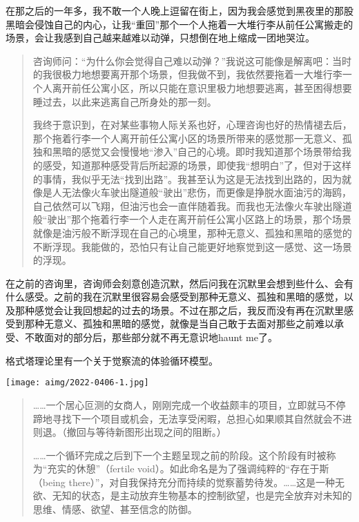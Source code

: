 在那之后的一年多，我不敢一个人晚上逗留在街上，因为我会感觉到黑夜里的那股黑暗会侵蚀自己的内心，让我“重回”那个一个人拖着一大堆行李从前任公寓搬走的场景，会让我感到自己越来越难以动弹，只想倒在地上缩成一团地哭泣。

\blockquote{
	咨询师问：“为什么你会觉得自己难以动弹？”我说这可能像是解离吧：当时的我很极力地想要离开那个场景，但我做不到，我依然要拖着一大堆行李一个人离开前任公寓小区，所以只能在意识里极力地想要逃离，甚至困得想要睡过去，以此来逃离自己所身处的那一刻。

	我终于意识到，在对某些事物\pozhehao{}人际关系也好，心理咨询也好\pozhehao{}的热情褪去后，那个拖着行李一个人离开前任公寓小区的场景所带来的感觉\pozhehao{}那一无意义、孤独和黑暗的感觉又会慢慢地“渗入”自己的心境。即时我知道那个场景带给我的感受，知道那种感受背后所起源的场景，即使我“想明白”了，但对于这样的事情，我似乎无法“找到出路”。我甚至认为这是无法找到出路的，因为就像是人无法像火车驶出隧道般“驶出”悲伤，而更像是挣脱水面油污的海鸥，自己依然可以飞翔，但油污也会一直伴随着我。而我也无法像火车驶出隧道般“驶出”那个拖着行李一个人走在离开前任公寓小区路上的场景，那个场景就像是油污般不断浮现在自己的心境里，那种无意义、孤独和黑暗的感觉的不断浮现。我能做的，恐怕只有让自己能更好地察觉到这一感觉、这一场景的浮现。

}

在之前的咨询里，咨询师会刻意创造沉默，然后问我在沉默里会想到些什么、会有什么感受。之前的我在沉默里很容易会感受到那种无意义、孤独和黑暗的感觉，以及那种感觉会让我回想起的过去的场景。不过在那之后，我反而没有再在沉默里感受到那种无意义、孤独和黑暗的感觉，就像是当自己敢于去面对那些之前难以承受、不敢面对的部分后，那些部分就不再无意识地haunt me了。

格式塔理论里有一个关于觉察流的体验循环模型。

\noindent\begin{minipage}{\linewidth}
	\centering
	\vspace{3pt}
	\texttt{[image: aimg/2022-0406-1.jpg]}
	\vspace{3pt}
\end{minipage}

\blockquote{
	……一个居心叵测的女商人，刚刚完成一个收益颇丰的项目，立即就马不停蹄地寻找下一个项目或机会，无法享受闲暇，总担心如果顺其自然就会不进则退。（撤回与等待新图形出现之间的阻断。）

	……一个循环完成之后到下一个主题呈现之前的阶段。这个阶段有时被称为“充实的休憩”（fertile void）。如此命名是为了强调纯粹的“存在于斯（being there）”，对自我保持充分而持续的觉察蓄势待发。……这是一种无欲、无知的状态，是主动放弃生物基本的控制欲望，也是完全放弃对未知的思维、情感、欲望、甚至信念的防御。

}

